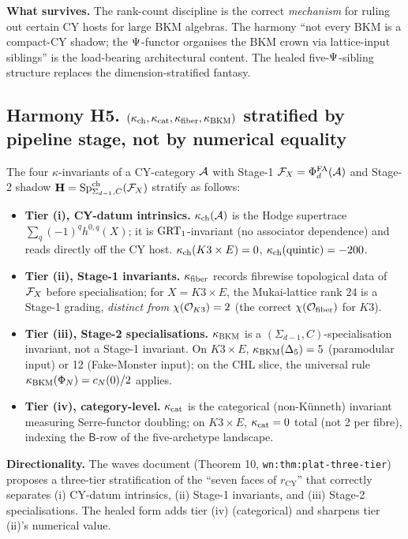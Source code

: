\textbf{What survives.} The rank-count discipline is the correct
\emph{mechanism} for ruling out certain CY hosts for large BKM algebras.
The harmony ``not every BKM is a compact-CY shadow; the $\Psi$-functor
organises the BKM crown via lattice-input siblings'' is the load-bearing
architectural content. The healed five-$\Psi$-sibling structure
replaces the dimension-stratified fantasy.

\subsection{Harmony H5. $(\kappa_{\mathrm{ch}}, \kappa_{\mathrm{cat}}, \kappa_{\mathrm{fiber}}, \kappa_{\mathrm{BKM}})$ stratified by
pipeline stage, not by numerical equality}
\label{wn:subsec:H5-kappa-stratification}

\begin{theorem}\ClaimStatusScoped
\label{wn:thm:H5-kappa-stratification}
The four $\kappa$-invariants of a CY-category $\mathcal{A}$ with Stage-1
$\mathcal{F}_{X} = \Phi^{\mathrm{FA}}_d(\mathcal{A})$ and Stage-2 shadow
$\mathbf{H} = \mathrm{Sp}^{\mathrm{ch}}_{\Sigma_{d-1}, C}(\mathcal{F}_X)$ stratify as follows:
\begin{itemize}
\item \textbf{Tier (i), CY-datum intrinsics.} $\kappa_{\mathrm{ch}}(\mathcal{A})$ is the
Hodge supertrace $\sum_q (-1)^q h^{0, q}(X)$; it is
$\mathrm{GRT}_1$-invariant (no associator dependence) and reads directly off the
CY host. $\kappa_{\mathrm{ch}}(K3 \times E) = 0$, $\kappa_{\mathrm{ch}}(\mathrm{quintic}) = -200$.
\item \textbf{Tier (ii), Stage-1 invariants.} $\kappa_{\mathrm{fiber}}$ records fibrewise
topological data of $\mathcal{F}_X$ before specialisation; for
$X = K3 \times E$, the Mukai-lattice rank $24$ is a Stage-1 grading,
\emph{distinct from} $\chi(\mathcal{O}_{K3}) = 2$ (the correct
$\chi(\mathcal{O}_\mathrm{fiber})$ for $K3$).
\item \textbf{Tier (iii), Stage-2 specialisations.} $\kappa_{\mathrm{BKM}}$ is a
$(\Sigma_{d-1}, C)$-specialisation invariant, not a Stage-1 invariant.
On $K3 \times E$, $\kappa_{\mathrm{BKM}}(\Delta_5) = 5$ (paramodular input) or 12
(Fake-Monster input); on the CHL slice, the universal rule
$\kappa_{\mathrm{BKM}}(\Phi_N) = c_N(0)/2$ applies.
\item \textbf{Tier (iv), category-level.} $\kappa_{\mathrm{cat}}$ is the categorical
(non-K\"unneth) invariant measuring Serre-functor doubling; on
$K3 \times E$, $\kappa_{\mathrm{cat}} = 0$ total (not 2 per fibre), indexing the
$\mathsf{B}$-row of the five-archetype landscape.
\end{itemize}
\end{theorem}

\textbf{Directionality.} The waves document (Theorem 10,
\verb|wn:thm:plat-three-tier|) proposes a three-tier stratification of
the ``seven faces of $r_{\mathrm{CY}}$'' that correctly separates
(i) CY-datum intrinsics, (ii) Stage-1 invariants, and (iii) Stage-2
specialisations. The healed form adds tier (iv) (categorical) and
sharpens tier (ii)'s numerical value.

